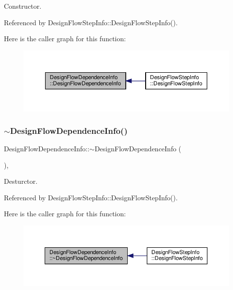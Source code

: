 Constructor. 



Referenced by Design\+Flow\+Step\+Info\+::\+Design\+Flow\+Step\+Info().

Here is the caller graph for this function\+:
\nopagebreak
\begin{figure}[H]
\begin{center}
\leavevmode
\includegraphics[width=350pt]{d9/ded/structDesignFlowDependenceInfo_a444d7e0a77d91ee8acd83fa697a511d0_icgraph}
\end{center}
\end{figure}
\mbox{\label{structDesignFlowDependenceInfo_ab381d8213f756798fb687118a1fb9eb3}} 
\subsubsection{\texorpdfstring{$\sim$\+Design\+Flow\+Dependence\+Info()}{~DesignFlowDependenceInfo()}}
{\footnotesize\ttfamily Design\+Flow\+Dependence\+Info\+::$\sim$\+Design\+Flow\+Dependence\+Info (\begin{DoxyParamCaption}{ }\end{DoxyParamCaption})\hspace{0.3cm}{\ttfamily [override]}, {\ttfamily [default]}}



Desturctor. 



Referenced by Design\+Flow\+Step\+Info\+::\+Design\+Flow\+Step\+Info().

Here is the caller graph for this function\+:
\nopagebreak
\begin{figure}[H]
\begin{center}
\leavevmode
\includegraphics[width=350pt]{d9/ded/structDesignFlowDependenceInfo_ab381d8213f756798fb687118a1fb9eb3_icgraph}
\end{center}
\end{figure}


